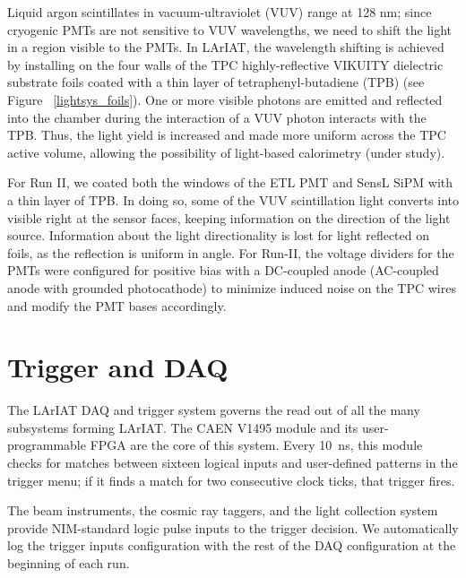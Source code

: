 Liquid argon scintillates in vacuum-ultraviolet (VUV) range at 128 nm; since cryogenic PMTs are not sensitive to VUV wavelengths, we need to shift the light in a region visible to the PMTs. In LArIAT, the wavelength shifting is achieved by installing on the four walls of the TPC highly-reflective VIKUITY dielectric substrate foils coated with a thin layer of tetraphenyl-butadiene (TPB) (see Figure ~\ref{lightsys_foils}). One or more visible photons  are emitted and reflected into the chamber during the interaction of a VUV photon interacts with the TPB. Thus, the light yield is increased and made more uniform across the TPC active volume, allowing the possibility of light-based calorimetry (under study).


For Run II, we coated both  the windows of the ETL PMT and SensL SiPM  with a thin layer of TPB. In doing so, some of the VUV scintillation light converts into visible right at the sensor faces, keeping information on the direction of the light source. Information about the light directionality is lost for light reflected on foils, as the reflection is uniform in angle. For Run-II, the voltage dividers for the PMTs were configured for positive bias with a DC-coupled anode (AC-coupled anode with grounded photocathode) to minimize induced noise on the TPC wires and modify the PMT bases accordingly.  



\section{Trigger and DAQ}
The LArIAT DAQ and trigger system governs the read out of all the many subsystems forming LArIAT. 
The CAEN V1495 module and its user-programmable FPGA  are the core of this system.  Every 10~ns, this module checks for matches between sixteen logical inputs and user-defined patterns in the trigger menu; if it finds a match for two consecutive clock ticks, that trigger fires.

The beam instruments,  the cosmic ray taggers, and the light collection system provide NIM-standard logic pulse inputs to the trigger decision. We automatically log the trigger inputs configuration with the rest of the DAQ configuration at the beginning of each run.

